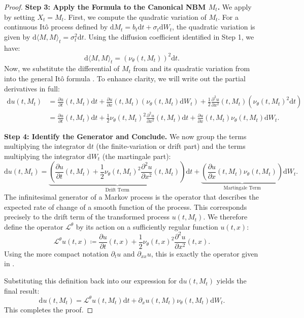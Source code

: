 \documentclass[qian]{imsart}
\newcommand{\dd}{\mathrm{d}}
\newcommand{\Lcaltheta}{\mathcal{L}^{\theta}}
\theoremstyle{plain}
\theoremstyle{definition}
\begin{document}
\begin{proof}
\textbf{Step 3: Apply the Formula to the Canonical NBM $M_t$.}
We apply  by setting $X_t = M_t$. First, we compute the quadratic variation of $M_t$. For a continuous Itô process defined by $\dd M_t = b_t \dd t + \sigma_t \dd W_t$, the quadratic variation is given by $\dd\langle M, M \rangle_t = \sigma_t^2 \dd t$. Using the diffusion coefficient identified in Step 1, we have:
\begin{equation} \label{eq:proof_qv}
    \dd\langle M, M \rangle_t = (\nu_\theta(t, M_t))^2 \dd t.
\end{equation}
Now, we substitute the differential of $M_t$ from  and its quadratic variation from  into the general Itô formula . To enhance clarity, we will write out the partial derivatives in full:
\begin{align*}
    \dd u(t, M_t) &= \frac{\partial u}{\partial t}(t,M_t) \dd t + \frac{\partial u}{\partial x}(t,M_t) \left( \nu_\theta(t, M_t) \dd W_t \right) + \frac{1}{2}\frac{\partial^2 u}{\partial x^2}(t,M_t) \left( \nu_\theta(t, M_t)^2 \dd t \right) \\
    &= \frac{\partial u}{\partial t}(t,M_t) \dd t + \frac{1}{2}\nu_\theta(t,M_t)^2 \frac{\partial^2 u}{\partial x^2}(t,M_t) \dd t + \frac{\partial u}{\partial x}(t,M_t) \nu_\theta(t,M_t) \dd W_t.
\end{align*}

\textbf{Step 4: Identify the Generator and Conclude.}
We now group the terms multiplying the integrator $\dd t$ (the finite-variation or drift part) and the terms multiplying the integrator $\dd W_t$ (the martingale part):
\[
    \dd u(t, M_t) = \underbrace{\left( \frac{\partial u}{\partial t}(t,M_t) + \frac{1}{2}\nu_\theta(t,M_t)^2 \frac{\partial^2 u}{\partial x^2}(t,M_t) \right)}_{\text{Drift Term}} \dd t + \underbrace{\left( \frac{\partial u}{\partial x}(t,M_t) \nu_\theta(t,M_t) \right)}_{\text{Martingale Term}} \dd W_t.
\]
The infinitesimal generator of a Markov process is the operator that describes the expected rate of change of a smooth function of the process. This corresponds precisely to the drift term of the transformed process $u(t, M_t)$. We therefore define the operator $\Lcaltheta$ by its action on a sufficiently regular function $u(t,x)$:
\[
    \Lcaltheta u(t,x) \coloneqq \frac{\partial u}{\partial t}(t,x) + \frac{1}{2}\nu_\theta(t,x)^2 \frac{\partial^2 u}{\partial x^2}(t,x).
\]
Using the more compact notation $\partial_t u$ and $\partial_{xx} u$, this is exactly the operator given in .

Substituting this definition back into our expression for $\dd u(t, M_t)$ yields the final result:
\[
    \dd u(t, M_t) = \Lcaltheta u(t, M_t) \dd t + \partial_x u(t, M_t) \nu_\theta(t, M_t) \dd W_t.
\]
This completes the proof.
\end{proof}
\end{document}
